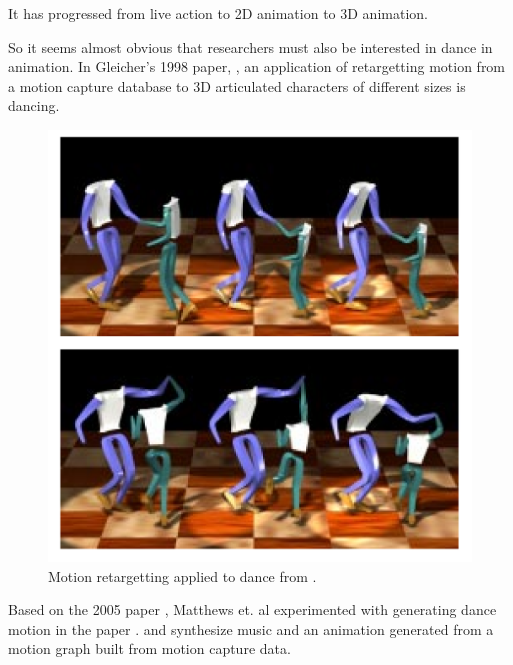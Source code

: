 It has progressed from live action to 2D animation to 3D animation.

So it seems almost obvious that researchers must also be interested in dance in animation. In Gleicher's 1998 paper, \citep{gleicher1998retargetting}, an application of retargetting motion from a motion capture database to 3D articulated characters of different sizes is dancing.

\begin{figure}[!h]
\centering
\includegraphics[scale=0.5]{img/retarget}
\caption{Motion retargetting applied to dance from \citep{gleicher1998retargetting}.}
\end{figure}

Based on the 2005 paper \citep{calvert2005applications}, Matthews et. al experimented with generating dance motion in the paper \citep{matthews2011procedural}. \citep{shiratori2006dancing} and \citep{shiratori2006synthesizing} synthesize music and an animation generated from a motion graph built from motion capture data.
